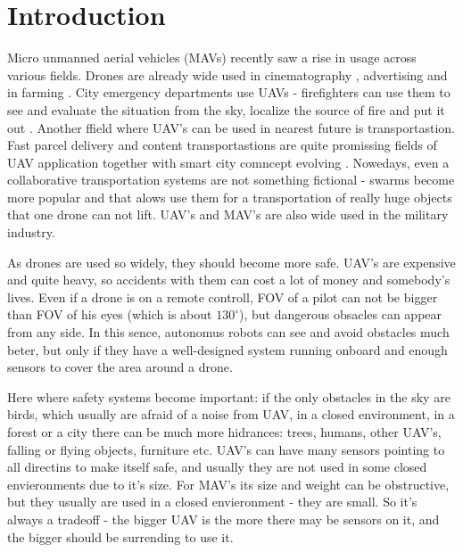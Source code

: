 \chapter{Introduction}

\label{chapter:intro}

Micro unmanned aerial vehicles (MAVs) recently saw a rise in usage across various fields. Drones are already wide used in cinematography \cite{Mademlis2020}, advertising \cite{Ullah2021} and in farming \cite{Kim2019}. 
City emergency departments use UAVs - firefighters can use them to see and evaluate the situation from the sky, localize the source of fire and put it out \cite{Pritzl2021}.
Another ffield where UAV's can be used in nearest future is transportastion. 
Fast parcel delivery \cite{San2018} and content transportastions \cite{Gupta2021,Aloqaily2022} are quite promissing fields of UAV application together with smart city comncept evolving \cite{Ortiz2019}.
Nowedays, even a collaborative transportation systems are not something fictional - swarms become more popular and that alows use them for a transportation of really huge objects \cite{Bacelar2020} that one drone can not lift. 
UAV's and MAV's are also wide used in the military industry\cite{Duz2021}.

As drones are used so widely, they should become more safe. 
UAV's are expensive and quite heavy, so accidents with them can cost a lot of money and somebody's lives. 
Even if a drone is on a remote controll, FOV of a pilot can not be bigger than FOV of his eyes (which is about $130^\circ$), but dangerous obsacles can appear from any side.
In this sence, autonomus robots can see and avoid obstacles much beter, but only if they have a well-designed system running onboard and enough sensors to cover the area around a drone.

Here where safety systems become important: if the only obstacles in the sky are birds, which usually are afraid of a noise from UAV, in a closed environment, in a forest or a city there can be much more hidrances: trees, humans, other UAV's, falling or flying objects, furniture etc.
UAV's can have many sensors pointing to all directins to make itself safe, and usually they are not used in some closed envieronments due to it's size.
For MAV's its size and weight can be obstructive, but they usually are used in a closed envieronment - they are small.
So it's always a tradeoff - the bigger UAV is the more there may be sensors on it, and the bigger should be surrending to use it. 

